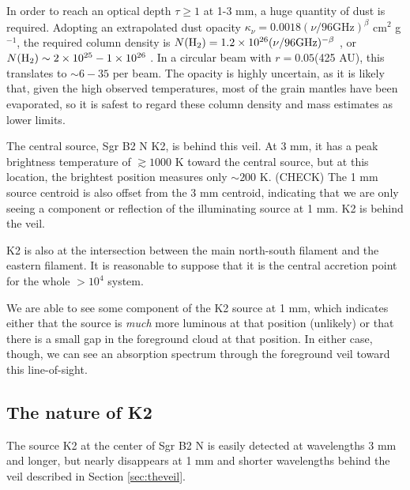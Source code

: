 \documentclass[twocolumn]{aastex61}
\begin{document}
In order to reach an optical depth $\tau\geq1$ at 1-3 mm, a huge quantity of
dust is required.  Adopting an extrapolated dust opacity $\kappa_\nu = 0.0018
(\nu/96 \mathrm{GHz})^{\beta}$ cm$^2$ g$^{-1}$, the required column density is
$N(\textrm{H}_{2}) = 1.2\times10^{26} (\nu/96 \mathrm{GHz})^{-\beta}$ \persc, or $N(\textrm{H}_{2}) \sim
2\times10^{25} - 1\times10^{26}$ \persc.  In a circular beam with $r=0.05$\arcsec (425 AU),
this translates to $\sim6-35$ \msun per beam.  The opacity is highly uncertain,
as it is likely that, given the high observed temperatures, most of the grain
mantles have been evaporated, so it is safest to regard these column density
and mass estimates as lower limits.

The central source, Sgr B2 N K2, is behind this veil.  At 3 mm, it has a peak
brightness temperature of $\gtrsim1000$ K toward the central source, but at this
location, the brightest position measures only $\sim200$ K.  (CHECK) The 1 mm 
source centroid is also offset from the 3 mm centroid, indicating that we are
only seeing a component or reflection of the illuminating source at 1 mm.
K2 is behind the veil.

K2 is also at the intersection between the main north-south filament and the
eastern filament.  It is reasonable to suppose that it is the central
accretion point for the whole $>10^4$ \msun system.

We are able to see some component of the K2 source at 1 mm, which indicates
either that the source is \emph{much} more luminous at that position (unlikely)
or that there is a small gap in the foreground cloud at that position.
In either case, though, we can see an absorption spectrum through the foreground
veil toward this line-of-sight.





\subsection{The nature of K2}
\label{sec:natureofk2}
The source K2 at the center of Sgr B2 N is easily detected at wavelengths 3 mm
and longer, but nearly disappears at 1 mm and shorter wavelengths behind the
veil described in Section \ref{sec:theveil}.
\end{document}
